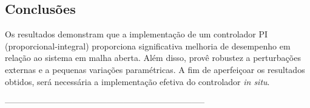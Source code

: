 \documentclass[a0,portrait]{a0poster}
\begin{document}
\begin{multicols}{2}





\section*{Conclusões}
	Os resultados demonstram que a implementação de um controlador PI (proporcional-integral) proporciona significativa melhoria de desempenho em relação ao sistema em malha aberta. Além disso, provê robustez a perturbações externas e a pequenas variações paramétricas. A fim de aperfeiçoar os resultados obtidos, será necessária a implementação efetiva do controlador \textit{in situ}.

\color{DarkSlateGray} %


%

  
-----------------------------------------------------------------------

\end{multicols}
\end{document}
